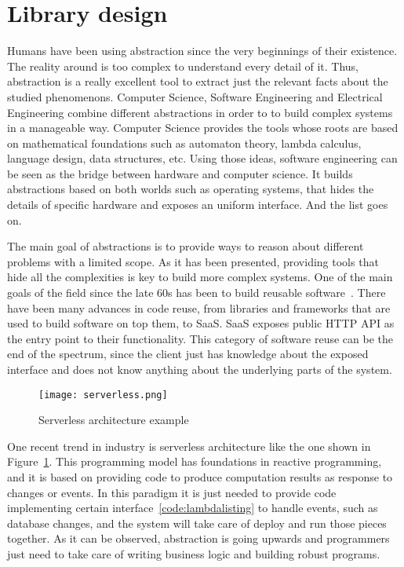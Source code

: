 \section{Library design}

Humans have been using abstraction since the very beginnings of their existence.
The reality around is too complex to understand every detail of it. Thus,
abstraction is a really excellent tool to extract just the relevant facts about
the studied phenomenons. Computer Science, Software Engineering and Electrical
Engineering combine different abstractions in order to to build complex systems
in a manageable way.
Computer Science provides the tools whose roots are based on mathematical
foundations such as automaton theory, lambda calculus, language design, data
structures, etc.
Using those ideas, software engineering can be seen as the bridge between
hardware and computer science. It builds abstractions based on both worlds such
as operating systems, that hides the details of specific hardware and exposes an
uniform interface. And the list goes on.

The main goal of abstractions is to
provide ways to reason about different problems with a limited scope.
As it has been presented, providing tools that hide all the complexities is key to
build more complex systems. One of the main goals of the field since the late
60s has been to build reusable software~\cite{reuse}. There have been many
advances in code reuse, from libraries and frameworks that are used to build
software on top them, to \acf{SaaS}. SaaS exposes public \ac{HTTP}
\ac{API} as the entry point to their functionality. This category of software reuse
can be the end of the spectrum, since the client just has knowledge about
the exposed interface and does not know anything about the underlying parts of the
system.

\begin{figure}[!h]
\begin{center}
\texttt{[image: serverless.png]}
\caption{Serverless architecture example~\cite{awsserverless}}
\label{fig:serverless}
\end{center}
\end{figure}

One recent trend in industry is serverless architecture like the one shown in
Figure~\ref{fig:serverless}. This programming model has foundations in reactive
programming, and it is based on providing code to produce computation results as
response to changes or events. In this paradigm it is just needed to provide
code implementing certain interface~\ref{code:lambdalisting} to handle events,
such as database changes, and the system will take care of deploy and run those
pieces together. As it can be observed, abstraction is going upwards and
programmers just need to take care of writing business logic and building
robust programs.

